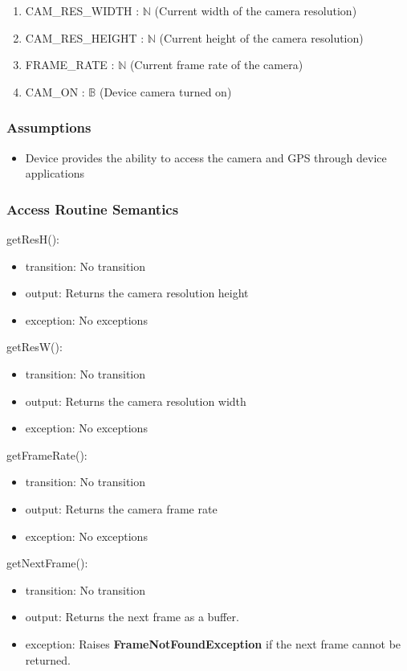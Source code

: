 \documentclass[12pt, titlepage]{article}
\begin{document}
\begin{enumerate}
  \item CAM\_RES\_WIDTH : $\mathbb{N}$ (Current width of the camera resolution)
  \item CAM\_RES\_HEIGHT : $\mathbb{N}$ (Current height of the camera resolution)
  \item FRAME\_RATE : $\mathbb{N}$ (Current frame rate of the camera)
  \item CAM\_ON : $\mathbb{B}$ (Device camera turned on)
\end{enumerate}
\subsubsection{Assumptions}

\begin{itemize}
  \item Device provides the ability to access the camera and GPS through device applications
\end{itemize}

\subsubsection{Access Routine Semantics}

\noindent getResH():
\begin{itemize}
\item transition: No transition
\item output: Returns the camera resolution height
\item exception: No exceptions
\end{itemize}

\noindent getResW():
\begin{itemize}
\item transition: No transition
\item output: Returns the camera resolution width
\item exception: No exceptions
\end{itemize}

\noindent getFrameRate():
\begin{itemize}
\item transition: No transition
\item output: Returns the camera frame rate
\item exception: No exceptions
\end{itemize}

\noindent getNextFrame():
\begin{itemize}
\item transition: No transition
\item output: Returns the next frame as a buffer.
\item exception: Raises \textbf{FrameNotFoundException} if the next frame cannot be returned.
\end{itemize}
\end{document}
